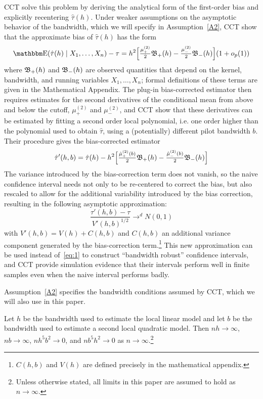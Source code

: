 \documentclass[12pt,fleqn]{article}
\begin{document}
CCT solve this problem by deriving the analytical form of the first-order bias
and explicitly recentering $\hat\tau(h)$. Under weaker assumptions on the
asymptotic behavior of the bandwidth, which we will specify in
Assumption~\ref{A2}, CCT show that the approximate bias of $\hat\tau(h)$ has the
form
\begin{equation*}
  \E(\hat{\tau}(h) \mid X_1,\dots,X_n) - \tau =
  h^{2}\Big[ \tfrac{\mu_{+}^{(2)}}{2}\Bf_{+}(h)
  - \tfrac{\mu_{-}^{(2)}}{2}\Bf_{-}(h) \Big]
  (1+o_{p}(1))
\end{equation*}
where $\mathfrak{B}_{+}(h)$ and $\mathfrak{B}_{-}(h)$ are observed quantities that depend on the
kernel, bandwidth, and running variables $X_1,\dots,X_n$; formal definitions of
these terms are given in the Mathematical Appendix. The plug-in bias-corrected
estimator then requires estimates
for the second derivatives of the conditional mean from above and below the
cutoff, $\mu_{+}^{(2)}$ and $\mu_{-}^{(2)}$, and CCT show that these derivatives
can be estimated by fitting a second order local polynomial, i.e. one order
higher than the polynomial used to obtain $\hat{\tau}$, using a (potentially)
different pilot bandwidth $b$. Their procedure gives the bias-corrected
estimator
\begin{gather*}
  \hat{\tau}'(h, b) = \hat{\tau}(h) - h^{2}
  \Big[\tfrac{\hat{\mu}_{+}^{(2)}(b)}{2} \mathfrak{B}_{+}(h)
  - \tfrac{\hat{\mu}_{-}^{(2)}(b)}{2}\mathfrak{B}_{-}(h) \Big]
\end{gather*}
The variance introduced by the bias-correction term does not vanish, so the
naive confidence interval needs not only to be re-centered to correct the bias,
but also rescaled to allow for the additional variability introduced by the bias
correction, resulting in the following asymptotic approximation:
\begin{equation*}
  \frac{\hat{\tau}'(h, b) - \tau}{V'(h, b)^{1/2}} \to^d N(0,1)
\end{equation*}
with $V'(h, b) = V(h) + C(h, b)$ and $C(h, b)$ an additional variance component
generated by the bias-correction term.\footnote{%
  $C(h,b)$ and $V(h)$ are defined precisely in the mathematical appendix.} %
This new approximation can be used
instead of~\eqref{eq:1} to construct ``bandwidth robust'' confidence intervals,
and CCT provide simulation evidence that their intervals perform well in finite
samples even when the naive interval performs badly.

Assumption~\ref{A2} specifies the bandwidth conditions assumed by CCT, which we
will also use in this paper.
\begin{assumption}[Bandwidth]\label{A2}
  Let $h$ be the bandwidth used to estimate the local linear model and let
  $b$ be the bandwidth used to estimate a second local quadratic model. Then
  $n h \to \infty$, $n b \to \infty$, $n h^{5} b^{2} \to 0$, and
  $n b^{5} h^{2} \to 0$ as $n \to \infty$.\footnote{Unless otherwise stated, all limits in this paper are assumed to hold as
    $n \to \infty$.}
 
\end{assumption}
\end{document}

